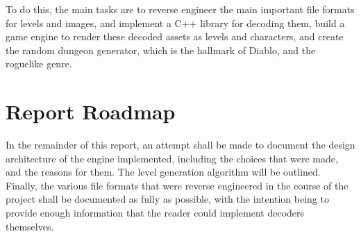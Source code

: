 	To do this, the main tasks are to reverse engineer the main important file formats for levels and images, and implement a C++ library for decoding them, build a game engine to render these decoded assets as levels and characters, and create the random dungeon generator, which is the hallmark of Diablo, and the roguelike genre.
	
	\section{Report Roadmap}
	In the remainder of this report, an attempt shall be made to document the design architecture of the engine  implemented, including the choices that were made, and the reasons for them. The level generation algorithm will be outlined. Finally, the various file formats that were reverse engineered in the course of the project shall be documented as fully as possible, with the intention being to provide enough information that the reader could implement decoders themselves.
